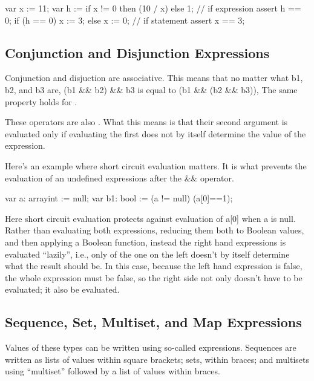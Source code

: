 \documentclass[letterpaper,10pt,english]{sphinxmanual}
\begin{document}
\begin{sphinxVerbatim}[commandchars=\\\{\}]
var x := 11;
var h := if x != 0 then (10 / x) else 1;    // if expression
assert h == 0;
if (h == 0) \PYGZob{}x := 3; \PYGZcb{} else \PYGZob{} x := 0; \PYGZcb{}     // if statement
assert x == 3;
\end{sphinxVerbatim}


\subsection{Conjunction and Disjunction Expressions}
\label{\detokenize{06-dafny-language:conjunction-and-disjunction-expressions}}
Conjunction and disjuction are associative. This means that no matter
what b1, b2, and b3 are, (b1 \&\& b2) \&\& b3 is equal to (b1 \&\& (b2 \&\&
b3)), The same property holds for \textbar{}\textbar{}.

These operators are also . What this means is that
their second argument is evaluated only if evaluating the first does
not by itself determine the value of the expression.

Here’s an example where short circuit evaluation matters. It is what
prevents the evaluation of an undefined expressions after the \&\&
operator.

\begin{sphinxVerbatim}[commandchars=\\\{\}]
var a: array\PYGZlt{}int\PYGZgt{} := null;
var b1: bool := (a != null) \PYGZam{}\PYGZam{} (a[0]==1);
\end{sphinxVerbatim}

Here short circuit evaluation protects against evaluation of a{[}0{]} when
a is null. Rather than evaluating both expressions, reducing them both
to Boolean values, and then applying a Boolean  function, instead
the right hand expressions is evaluated “lazily”, i.e., only of the
one on the left doesn’t by itself determine what the result should
be. In this case, because the left hand expression is false, the whole
expression must be false, so the right side not only doesn’t have to
be evaluated; it also  be evaluated.


\subsection{Sequence, Set, Multiset, and Map Expressions}
\label{\detokenize{06-dafny-language:sequence-set-multiset-and-map-expressions}}
Values of these types can be written using so-called 
expressions. Sequences are written as lists of values within square
brackets; sets, within braces; and multisets using “multiset” followed
by a list of values within braces.
\end{document}
